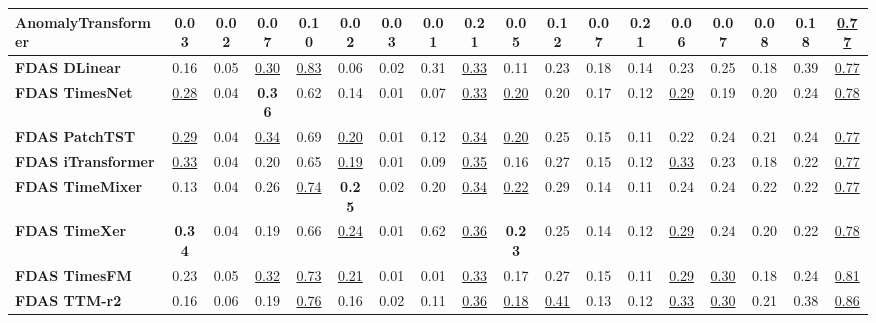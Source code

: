 \documentclass[border=2pt]{standalone}
\begin{document}
\begin{tabular}{l|ccccccccccccccccc}
AnomalyTransformer     & 0.03 & 0.02 & 0.07 & 0.10 & 0.02 & 0.03 & 0.01 & 0.21 & 0.05 & 0.12 & 0.07 & 0.21 & 0.06 & 0.07 & 0.08 & 0.18 & \underline{0.77} \\
\midrule
\textbf{FDAS DLinear} & 0.16 & 0.05 & \underline{0.30} & \underline{0.83} & 0.06 & 0.02 & 0.31 & \underline{0.33} & 0.11 & 0.23 & 0.18 & 0.14 & 0.23 & 0.25 & 0.18 & 0.39 & \underline{0.77} \\
\textbf{FDAS TimesNet} & \underline{0.28} & 0.04 & \textbf{0.36} & 0.62 & 0.14 & 0.01 & 0.07 & \underline{0.33} & \underline{0.20} & 0.20 & 0.17 & 0.12 & \underline{0.29} & 0.19 & 0.20 & 0.24 & \underline{0.78} \\
\textbf{FDAS PatchTST} & \underline{0.29} & 0.04 & \underline{0.34} & 0.69 & \underline{0.20} & 0.01 & 0.12 & \underline{0.34} & \underline{0.20} & 0.25 & 0.15 & 0.11 & 0.22 & 0.24 & 0.21 & 0.24 & \underline{0.77} \\
\textbf{FDAS iTransformer} & \underline{0.33} & 0.04 & 0.20 & 0.65 & \underline{0.19} & 0.01 & 0.09 & \underline{0.35} & 0.16 & 0.27 & 0.15 & 0.12 & \underline{0.33} & 0.23 & 0.18 & 0.22 & \underline{0.77} \\
\textbf{FDAS TimeMixer} & 0.13 & 0.04 & 0.26 & \underline{0.74} & \textbf{0.25} & 0.02 & 0.20 & \underline{0.34} & \underline{0.22} & 0.29 & 0.14 & 0.11 & 0.24 & 0.24 & 0.22 & 0.22 & \underline{0.77} \\
\textbf{FDAS TimeXer} & \textbf{0.34} & 0.04 & 0.19 & 0.66 & \underline{0.24} & 0.01 & 0.62 & \underline{0.36} & \textbf{0.23} & 0.25 & 0.14 & 0.12 & \underline{0.29} & 0.24 & 0.20 & 0.22 & \underline{0.78} \\
\midrule
\textbf{FDAS TimesFM} & 0.23 & 0.05 & \underline{0.32} & \underline{0.73} & \underline{0.21} & 0.01 & 0.01 & \underline{0.33} & 0.17 & 0.27 & 0.15 & 0.11 & \underline{0.29} & \underline{0.30} & 0.18 & 0.24 & \underline{0.81} \\
\textbf{FDAS TTM-r2} & 0.16 & 0.06 & 0.19 & \underline{0.76} & 0.16 & 0.02 & 0.11 & \underline{0.36} & \underline{0.18} & \underline{0.41} & 0.13 & 0.12 & \underline{0.33} & \underline{0.30} & 0.21 & 0.38 & \underline{0.86} \\
\bottomrule
\end{tabular}
\end{document}
